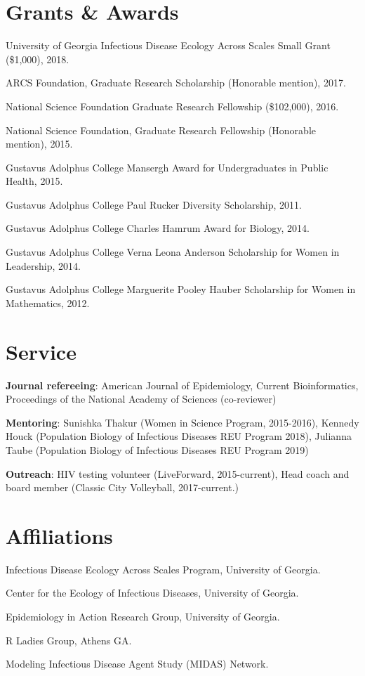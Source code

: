 \documentclass[letterpaper]{article}
\renewenvironment{itemize}{
  \begin{list}{}{
    \setlength{\leftmargin}{1.5em}
  }
}{
  \end{list}
}
\begin{document}
\section*{Grants \& Awards}
\begin{itemize}
\item University of Georgia Infectious Disease Ecology Across Scales Small Grant (\$1,000), 2018. 
\item ARCS Foundation, Graduate Research Scholarship (Honorable mention), 2017.
\item National Science Foundation Graduate Research Fellowship (\$102,000), 2016. 
\item National Science Foundation, Graduate Research Fellowship (Honorable mention), 2015.
\item Gustavus Adolphus College Mansergh Award for Undergraduates in Public Health, 2015.
\item Gustavus Adolphus College Paul Rucker Diversity Scholarship, 2011.
\item Gustavus Adolphus College Charles Hamrum Award for Biology, 2014.
\item Gustavus Adolphus College Verna Leona Anderson Scholarship for Women in Leadership, 2014. 
\item Gustavus Adolphus College Marguerite Pooley Hauber Scholarship for Women in Mathematics, 2012. 
\end{itemize}

\section*{Service}
\begin{itemize}
\item \textbf{Journal refereeing}: American Journal of Epidemiology, Current Bioinformatics, Proceedings of the National Academy of Sciences (co-reviewer)
\item \textbf{Mentoring}: Sunishka Thakur (Women in Science Program, 2015-2016), Kennedy Houck (Population Biology of Infectious Diseases REU Program 2018), Julianna Taube (Population Biology of Infectious Diseases REU Program 2019)
\item \textbf{Outreach}: HIV testing volunteer (LiveForward, 2015-current), Head coach and board member (Classic City Volleyball, 2017-current.) 
\end{itemize}

\section*{Affiliations}
\begin{itemize}
\item Infectious Disease Ecology Across Scales Program, University of Georgia. 
\item Center for the Ecology of Infectious Diseases, University of Georgia. 
\item Epidemiology in Action Research Group, University of Georgia. 
\item R Ladies Group, Athens GA. 
\item Modeling Infectious Disease Agent Study (MIDAS) Network. 

\end{itemize}
\end{document}
